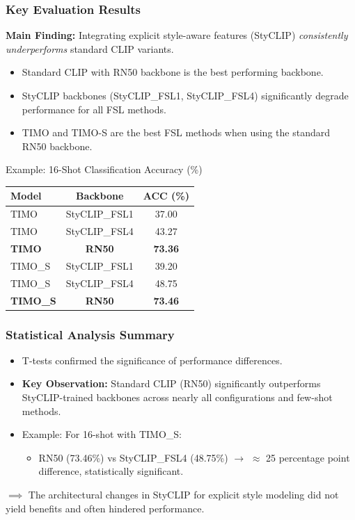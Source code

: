 \documentclass[aspectratio=169,xcolor=dvipsnames]{beamer}
\begin{document}
\begin{frame}
  \frametitle{Key Evaluation Results}
  \textbf{Main Finding:} Integrating explicit style-aware features (StyCLIP) \textit{consistently underperforms} standard CLIP variants.

  \begin{itemize}
    \item Standard CLIP with RN50 backbone is the best performing backbone.
    \item StyCLIP backbones (StyCLIP\_FSL1, StyCLIP\_FSL4) significantly degrade performance for all FSL methods.
    \item TIMO and TIMO-S are the best FSL methods when using the standard RN50 backbone.
  \end{itemize}

  \begin{block}{Example: 16-Shot Classification Accuracy (\%)}
    \centering
    \tiny
    \begin{tabular}{@{}lcc@{}}
      \toprule
      \textbf{Model} & \textbf{Backbone} & \textbf{ACC (\%)} \\
      \midrule
      TIMO           & StyCLIP\_FSL1 & 37.00 \\
      TIMO           & StyCLIP\_FSL4 & 43.27 \\
      \textbf{TIMO}  & \textbf{RN50}      & \textbf{73.36} \\
      \midrule
      TIMO\_S  & StyCLIP\_FSL1 & 39.20 \\
      TIMO\_S  & StyCLIP\_FSL4 & 48.75 \\
      \textbf{TIMO\_S } & \textbf{RN50}      & \textbf{73.46} \\
      \bottomrule
    \end{tabular}
    \normalsize
  \end{block}
\end{frame}

\begin{frame}
    \frametitle{Statistical Analysis Summary}
    \begin{itemize}
        \item T-tests confirmed the significance of performance differences.
        \item \textbf{Key Observation:} Standard CLIP (RN50) significantly outperforms StyCLIP-trained backbones across nearly all configurations and few-shot methods.
        \item Example: For 16-shot with TIMO\_S:
        \begin{itemize}
            \item RN50 (73.46\%) vs StyCLIP\_FSL4 (48.75\%) $\rightarrow$ $\approx$ 25 percentage point difference, statistically significant.
        \end{itemize}
    \end{itemize}
    $\implies$ The architectural changes in StyCLIP for explicit style modeling did not yield benefits and often hindered performance.
\end{frame}
\end{document}
